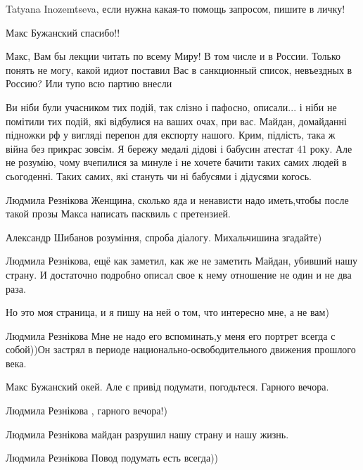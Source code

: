 \begin{itemize}
\begin{itemize}
Tatyana Inozemtseva, если нужна какая-то помощь запросом, пишите в личку!

Макс Бужанский спасибо!!

\end{itemize}


Макс, Вам бы лекции читать по всему Миру! В том числе и в России. Только понять
не могу, какой идиот поставил Вас в санкционный список, невъездных в Россию?
Или тупо всю партию внесли


Ви ніби були учасником тих подій, так слізно і пафосно, описали... і ніби не
помітили тих подій, які відбулися на ваших очах, при вас. Майдан, домайданні
підножки рф у вигляді перепон для експорту нашого. Крим, підлість, така ж війна
без прикрас зовсім. Я бережу медалі дідові і бабусин атестат 41 року. Але не
розумію, чому вчепилися за минуле і не хочете бачити таких самих людей в
сьогоденні. Таких самих, які стануть чи ні бабусями і дідусями когось.

\begin{itemize}
Людмила Резнікова Женщина, сколько яда и ненависти надо иметь,чтобы после такой
прозы Макса написать пасквиль с претензией.

Александр Шибанов розуміння, спроба діалогу. Михальчишина згадайте)


Людмила Резнікова, ещё как заметил, как же не заметить Майдан, убивший нашу
страну. И достаточно подробно описал свое к нему отношение не один и не два
раза.

Но это моя страница, и я пишу на ней о том, что интересно мне, а не вам)


Людмила Резнікова Мне не надо его вспоминать,у меня его портрет всегда с
собой))Он застрял в периоде национально-освободительного движения прошлого
века.


Макс Бужанский окей. Але є привід подумати, погодьтеся. Гарного вечора.

Людмила Резнікова , гарного вечора!)

Людмила Резнікова майдан разрушил нашу страну и нашу жизнь.

Людмила Резнікова Повод подумать есть всегда))


\end{itemize}
\end{itemize}
